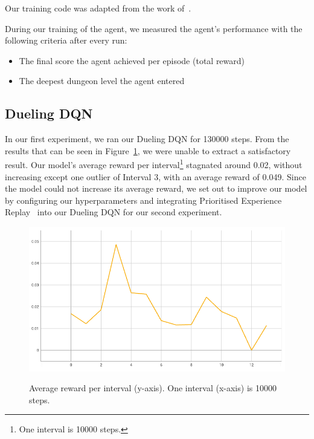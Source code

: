 \documentclass[12pt,a4paper]{article}
\begin{document}
    Our training code was adapted from the work of~\citet{sebtheiler}.

    During our training of the agent, we measured the agent's performance with the following criteria after every run:

    \begin{itemize}
        \item The final score the agent achieved per episode (total reward)
        \item The deepest dungeon level the agent entered
    \end{itemize}

    \subsection{Dueling DQN}\label{subsec:dueling-dqn}
    In our first experiment, we ran our Dueling DQN for 130000 steps.
    From the results that can be seen in Figure~\ref{fig:ddqn_interval_score}, we were unable to extract a satisfactory result.
    Our model's average reward per interval\footnote{One interval is 10000 steps.} stagnated around 0.02, without increasing except one outlier of Interval 3, with an average reward of 0.049.
    Since the model could not increase its average reward, we set out to improve our model by configuring our hyperparameters and integrating Prioritised Experience Replay~\citet{schaul16} into our Dueling DQN for our second experiment.
    \begin{figure}[H]
        \caption[DDQN: Average reward per interval.]{Average reward per interval (y-axis). One interval (x-axis) is 10000 steps.}
        \centering
        \includegraphics[scale=0.5]{interval_score_ddqn}
        \label{fig:ddqn_interval_score}
    \end{figure}
\end{document}

